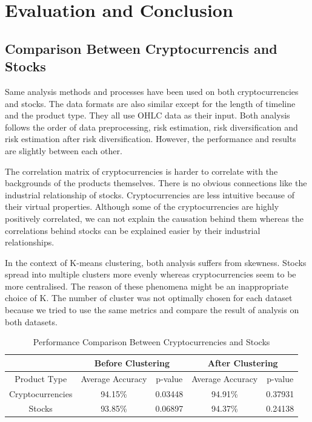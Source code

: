 \documentclass[11pt]{article} %
\theoremstyle{plain}
\theoremstyle{definition}
\begin{document}
\section{Evaluation and Conclusion}
\subsection{Comparison Between Cryptocurrencis and Stocks}

Same analysis methods and processes have been used on both cryptocurrencies and stocks. The data formats are also similar except for the length of timeline and the product type. They all use OHLC data as their input. Both analysis follows the order of data preprocessing, risk estimation, risk diversification and risk estimation after risk diversification. However, the performance and results are slightly between each other.

The correlation matrix of cryptocurrencies is harder to correlate with the backgrounds of the products themselves. There is no obvious connections like the industrial relationship of stocks. Cryptocurrencies are less intuitive because of their virtual properties. Although some of the cryptocurrencies are highly positively correlated, we can not explain the causation behind them whereas the correlations behind stocks can be explained easier by their industrial relationships.

In the context of K-means clustering, both analysis suffers from skewness. Stocks spread into multiple clusters more evenly whereas cryptocurrencies seem to be more centralised. The reason of these phenomena might be an inappropriate choice of K. The number of cluster was not optimally chosen for each dataset because we tried to use the same metrics and compare the result of analysis on both datasets.

{
  \begin{table}[ht]
    \centering
    \small
    \begin{tabular}{|c|c|c|c|c|}
        \hline
         & \multicolumn{2}{|c|}{Before Clustering} & \multicolumn{2}{|c|}{After Clustering} \\ [0.5ex]
        \hline
        Product Type & Average Accuracy & p-value & Average Accuracy & p-value\\ [0.5ex]
        \hline
        Cryptocurrencies & 94.15\% & 0.03448 & 94.91\% & 0.37931 \\
        \hline
        Stocks & 93.85\% & 0.06897 & 94.37\% & 0.24138 \\
        \hline
    \end{tabular}
    \caption{Performance Comparison Between Cryptocurrencies and Stocks}
    \label{table:comparison}
  \end{table}
}
\end{document}
